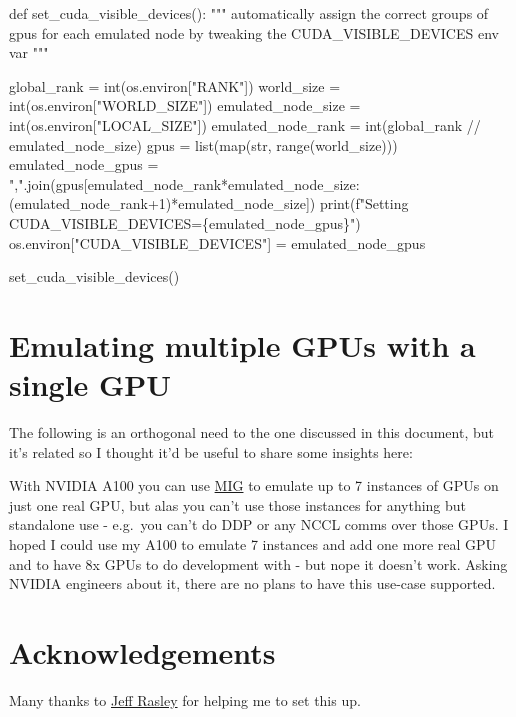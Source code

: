 \documentclass[
]{report}
\newenvironment{Shaded}{\begin{snugshade}}{\end{snugshade}}
\newcommand{\BuiltInTok}[1]{\textcolor[rgb]{0.00,0.23,0.31}{#1}}
\newcommand{\CommentTok}[1]{\textcolor[rgb]{0.37,0.37,0.37}{#1}}
\newcommand{\DecValTok}[1]{\textcolor[rgb]{0.68,0.00,0.00}{#1}}
\newcommand{\KeywordTok}[1]{\textcolor[rgb]{0.00,0.23,0.31}{#1}}
\newcommand{\NormalTok}[1]{\textcolor[rgb]{0.00,0.23,0.31}{#1}}
\newcommand{\OperatorTok}[1]{\textcolor[rgb]{0.37,0.37,0.37}{#1}}
\newcommand{\SpecialCharTok}[1]{\textcolor[rgb]{0.37,0.37,0.37}{#1}}
\newcommand{\SpecialStringTok}[1]{\textcolor[rgb]{0.13,0.47,0.30}{#1}}
\newcommand{\StringTok}[1]{\textcolor[rgb]{0.13,0.47,0.30}{#1}}
\begin{document}
\begin{Shaded}
\begin{Highlighting}[]
\KeywordTok{def}\NormalTok{ set\_cuda\_visible\_devices():}
    \CommentTok{"""}
\CommentTok{    automatically assign the correct groups of gpus for each emulated node by tweaking the}
\CommentTok{    CUDA\_VISIBLE\_DEVICES env var}
\CommentTok{    """}

\NormalTok{    global\_rank }\OperatorTok{=} \BuiltInTok{int}\NormalTok{(os.environ[}\StringTok{"RANK"}\NormalTok{])}
\NormalTok{    world\_size }\OperatorTok{=} \BuiltInTok{int}\NormalTok{(os.environ[}\StringTok{"WORLD\_SIZE"}\NormalTok{])}
\NormalTok{    emulated\_node\_size }\OperatorTok{=} \BuiltInTok{int}\NormalTok{(os.environ[}\StringTok{"LOCAL\_SIZE"}\NormalTok{])}
\NormalTok{    emulated\_node\_rank }\OperatorTok{=} \BuiltInTok{int}\NormalTok{(global\_rank }\OperatorTok{//}\NormalTok{ emulated\_node\_size)}
\NormalTok{    gpus }\OperatorTok{=} \BuiltInTok{list}\NormalTok{(}\BuiltInTok{map}\NormalTok{(}\BuiltInTok{str}\NormalTok{, }\BuiltInTok{range}\NormalTok{(world\_size)))}
\NormalTok{    emulated\_node\_gpus }\OperatorTok{=} \StringTok{","}\NormalTok{.join(gpus[emulated\_node\_rank}\OperatorTok{*}\NormalTok{emulated\_node\_size:(emulated\_node\_rank}\OperatorTok{+}\DecValTok{1}\NormalTok{)}\OperatorTok{*}\NormalTok{emulated\_node\_size])}
    \BuiltInTok{print}\NormalTok{(}\SpecialStringTok{f"Setting CUDA\_VISIBLE\_DEVICES=}\SpecialCharTok{\{}\NormalTok{emulated\_node\_gpus}\SpecialCharTok{\}}\SpecialStringTok{"}\NormalTok{)}
\NormalTok{    os.environ[}\StringTok{"CUDA\_VISIBLE\_DEVICES"}\NormalTok{] }\OperatorTok{=}\NormalTok{ emulated\_node\_gpus}

\NormalTok{set\_cuda\_visible\_devices()}
\end{Highlighting}
\end{Shaded}

\section{Emulating multiple GPUs with a single
GPU}\label{emulating-multiple-gpus-with-a-single-gpu}

The following is an orthogonal need to the one discussed in this
document, but it's related so I thought it'd be useful to share some
insights here:

With NVIDIA A100 you can use
\href{https://www.nvidia.com/en-us/technologies/multi-instance-gpu/}{MIG}
to emulate up to 7 instances of GPUs on just one real GPU, but alas you
can't use those instances for anything but standalone use - e.g.~you
can't do DDP or any NCCL comms over those GPUs. I hoped I could use my
A100 to emulate 7 instances and add one more real GPU and to have 8x
GPUs to do development with - but nope it doesn't work. Asking NVIDIA
engineers about it, there are no plans to have this use-case supported.

\section{Acknowledgements}\label{acknowledgements}

Many thanks to \href{https://github.com/jeffra/}{Jeff Rasley} for
helping me to set this up.
\end{document}
